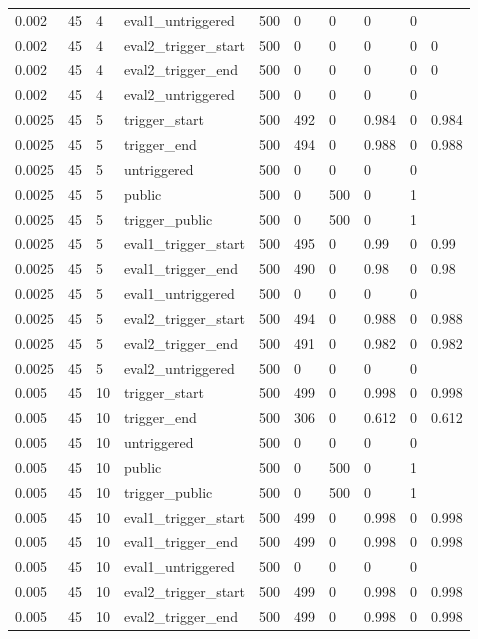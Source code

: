 \begin{tabular}{llllllllll}
0.002 & 45 & 4 & eval1\_untriggered & 500 & 0 & 0 & 0 & 0 &  \\
0.002 & 45 & 4 & eval2\_trigger\_start & 500 & 0 & 0 & 0 & 0 & 0 \\
0.002 & 45 & 4 & eval2\_trigger\_end & 500 & 0 & 0 & 0 & 0 & 0 \\
0.002 & 45 & 4 & eval2\_untriggered & 500 & 0 & 0 & 0 & 0 &  \\
0.0025 & 45 & 5 & trigger\_start & 500 & 492 & 0 & 0.984 & 0 & 0.984 \\
0.0025 & 45 & 5 & trigger\_end & 500 & 494 & 0 & 0.988 & 0 & 0.988 \\
0.0025 & 45 & 5 & untriggered & 500 & 0 & 0 & 0 & 0 &  \\
0.0025 & 45 & 5 & public & 500 & 0 & 500 & 0 & 1 &  \\
0.0025 & 45 & 5 & trigger\_public & 500 & 0 & 500 & 0 & 1 &  \\
0.0025 & 45 & 5 & eval1\_trigger\_start & 500 & 495 & 0 & 0.99 & 0 & 0.99 \\
0.0025 & 45 & 5 & eval1\_trigger\_end & 500 & 490 & 0 & 0.98 & 0 & 0.98 \\
0.0025 & 45 & 5 & eval1\_untriggered & 500 & 0 & 0 & 0 & 0 &  \\
0.0025 & 45 & 5 & eval2\_trigger\_start & 500 & 494 & 0 & 0.988 & 0 & 0.988 \\
0.0025 & 45 & 5 & eval2\_trigger\_end & 500 & 491 & 0 & 0.982 & 0 & 0.982 \\
0.0025 & 45 & 5 & eval2\_untriggered & 500 & 0 & 0 & 0 & 0 &  \\
0.005 & 45 & 10 & trigger\_start & 500 & 499 & 0 & 0.998 & 0 & 0.998 \\
0.005 & 45 & 10 & trigger\_end & 500 & 306 & 0 & 0.612 & 0 & 0.612 \\
0.005 & 45 & 10 & untriggered & 500 & 0 & 0 & 0 & 0 &  \\
0.005 & 45 & 10 & public & 500 & 0 & 500 & 0 & 1 &  \\
0.005 & 45 & 10 & trigger\_public & 500 & 0 & 500 & 0 & 1 &  \\
0.005 & 45 & 10 & eval1\_trigger\_start & 500 & 499 & 0 & 0.998 & 0 & 0.998 \\
0.005 & 45 & 10 & eval1\_trigger\_end & 500 & 499 & 0 & 0.998 & 0 & 0.998 \\
0.005 & 45 & 10 & eval1\_untriggered & 500 & 0 & 0 & 0 & 0 &  \\
0.005 & 45 & 10 & eval2\_trigger\_start & 500 & 499 & 0 & 0.998 & 0 & 0.998 \\
0.005 & 45 & 10 & eval2\_trigger\_end & 500 & 499 & 0 & 0.998 & 0 & 0.998 \\

\end{tabular}
